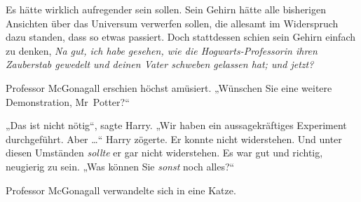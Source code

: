 Es hätte wirklich aufregender sein sollen. Sein Gehirn hätte alle bisherigen Ansichten über das Universum verwerfen sollen, die allesamt im Widerspruch dazu standen, dass so etwas passiert. Doch stattdessen schien sein Gehirn einfach zu denken, \emph{Na gut, ich habe gesehen, wie die Hogwarts-Professorin ihren Zauberstab gewedelt und deinen Vater schweben gelassen hat; und jetzt?}

Professor McGonagall erschien höchst amüsiert.
„Wünschen Sie eine weitere Demonstration, Mr~Potter?“

„Das ist nicht nötig“, sagte Harry.
„Wir haben ein aussagekräftiges Experiment durchgeführt. Aber …“ Harry zögerte. Er konnte nicht widerstehen. Und unter diesen Umständen \emph{sollte} er gar nicht widerstehen. Es war gut und richtig, neugierig zu sein.
„Was können Sie \emph{sonst} noch alles?“

Professor McGonagall verwandelte sich in eine Katze.

